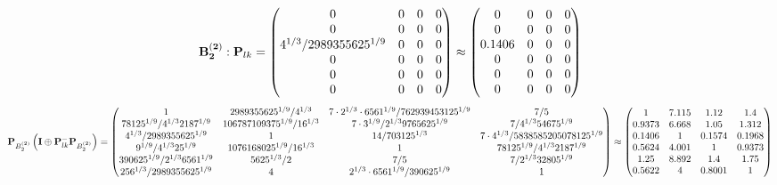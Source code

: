 \documentclass[10pt,a4paper]{article}
\begin{document}
	\[
		\bold{B_2^{(2)}}: \bold{P}_{lk} = 
		\begin{pmatrix}
			{{0}}{} & {{0}}{} & {{0}}{} & {{0}}{} \\
			{{0}}{} & {{0}}{} & {{0}}{} & {{0}}{} \\
			{{4^ {1 / 3}}} / {{2989355625^ {1 / 9}}} & {{0}}{} & {{0}}{} & {{0}}{} \\
			{{0}}{} & {{0}}{} & {{0}}{} & {{0}}{} \\
			{{0}}{} & {{0}}{} & {{0}}{} & {{0}}{} \\
			{{0}}{} & {{0}}{} & {{0}}{} & {{0}}{} \\
		\end{pmatrix}
		\approx
		\begin{pmatrix}
			0        & 0        & 0        & 0        \\
			0        & 0        & 0        & 0        \\
			0.1406   & 0        & 0        & 0        \\
			0        & 0        & 0        & 0        \\
			0        & 0        & 0        & 0        \\
			0        & 0        & 0        & 0        \\
		\end{pmatrix}
	\]
	\[
		\bold{P}_{B_2^{(2)}}\left(\bold{I} \oplus \bold{P}_{lk}^{-}\bold{P}_{B_2^{(2)}}\right) = 
		\begin{pmatrix}
			{1}{} & {{2989355625^ {1 / 9}}} / {{4^ {1 / 3}}} & {{7} \cdot {2^ {1 / 3}} \cdot {6561^ {1 / 9}}} / {{762939453125^ {1 / 9}}} & {{7}} / {{5}} \\
			{{78125^ {1 / 9}}} / {{4^ {1 / 3}}{2187^ {1 / 9}}} & {{106787109375^ {1 / 9}}} / {{16^ {1 / 3}}} & {{7} \cdot {3^ {1 / 9}}} / {{2^ {1 / 3}}{9765625^ {1 / 9}}} & {{7}} / {{4^ {1 / 3}}{54675^ {1 / 9}}} \\
			{{4^ {1 / 3}}} / {{2989355625^ {1 / 9}}} & {1}{} & {{14}} / {{703125^ {1 / 3}}} & {{7} \cdot {4^ {1 / 3}}} / {{5838585205078125^ {1 / 9}}} \\
			{{9^ {1 / 9}}} / {{4^ {1 / 3}}{25^ {1 / 9}}} & {{1076168025^ {1 / 9}}} / {{16^ {1 / 3}}} & {1}{} & {{78125^ {1 / 9}}} / {{4^ {1 / 3}}{2187^ {1 / 9}}} \\
			{{390625^ {1 / 9}}} / {{2^ {1 / 3}}{6561^ {1 / 9}}} & {{5625^ {1 / 3}}} / {{2}} & {{7}} / {{5}} & {{7}} / {{2^ {1 / 3}}{32805^ {1 / 9}}} \\
			{{256^ {1 / 3}}} / {{2989355625^ {1 / 9}}} & {{4}}{} & {{2^ {1 / 3}} \cdot {6561^ {1 / 9}}} / {{390625^ {1 / 9}}} & {1}{} \\
		\end{pmatrix}
		\approx
		\begin{pmatrix}
			1        & 7.115    & 1.12     & 1.4      \\
			0.9373   & 6.668    & 1.05     & 1.312    \\
			0.1406   & 1        & 0.1574   & 0.1968   \\
			0.5624   & 4.001    & 1        & 0.9373   \\
			1.25     & 8.892    & 1.4      & 1.75     \\
			0.5622   & 4        & 0.8001   & 1        \\
		\end{pmatrix}
	\]
\end{document}
